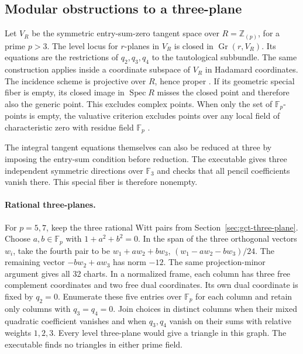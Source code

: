 \subsection{Modular obstructions to a three-plane}
\label{sec:gct-modular}

Let \(V_R\) be the symmetric entry-sum-zero tangent space over
\(R=\mathbb Z_{(p)}\), for a prime \(p>3\). The level locus for
\(r\)-planes in \(V_R\) is closed in \(\operatorname{Gr}(r,V_R)\).
Its equations are the restrictions of \(q_2,q_3,q_4\) to the
tautological subbundle. The same construction applies inside a
coordinate subspace of \(V_R\) in Hadamard coordinates.
The incidence scheme is projective over \(R\), hence proper
\cite{stacksprojectiveproper}. If its geometric special fiber is
empty, its closed image in \(\operatorname{Spec}R\) misses the closed
point and therefore also the generic point. This excludes complex
points. When only the set of \(\mathbb F_p\)-points is empty, the
valuative criterion excludes points over any local field of
characteristic zero with residue field \(\mathbb F_p\)
\cite{stacksvaluativeproper}.

The integral tangent equations themselves can also be reduced at
three by imposing the entry-sum condition before reduction. The
executable gives three independent symmetric directions over
\(\mathbb F_3\) and checks that all pencil coefficients vanish there.
This special fiber is therefore nonempty.

\paragraph{Rational three-planes.}
For \(p=5,7\), keep the three rational Witt pairs from
Section~\ref{sec:gct-three-plane}. Choose \(a,b\in\mathbb F_p\) with
\(1+a^2+b^2=0\). In the span of the three orthogonal vectors \(w_i\),
take the fourth pair to be
\(w_1+a w_2+b w_3\), \((w_1-a w_2-b w_3)/24\).
The remaining vector \(-b w_2+a w_3\) has norm \(-12\).
The same projection-minor argument gives all 32 charts.
In a normalized frame, each column has three free complement coordinates
and two free dual coordinates. Its own dual coordinate is fixed by
\(q_2=0\). Enumerate these five entries over \(\mathbb F_p\) for each
column and retain only columns with \(q_3=q_4=0\). Join choices in
distinct columns when their mixed quadratic coefficient vanishes and
when \(q_3,q_4\) vanish on their sums with relative weights \(1,2,3\).
Every level three-plane would give a triangle in this graph.
The executable finds no triangles in either prime field.

